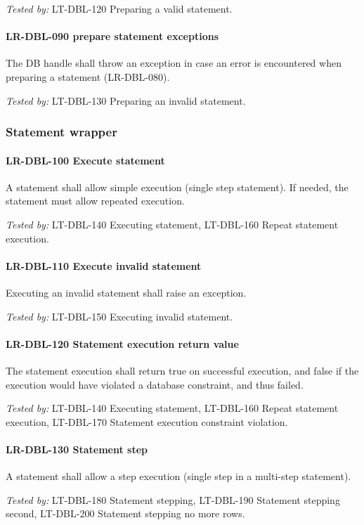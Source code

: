 \textit{Tested by: } LT-DBL-120 Preparing a valid statement.

\paragraph{LR-DBL-090 prepare statement exceptions}
The DB handle shall throw an exception in case an error is encountered when
preparing a statement (LR-DBL-080).

\textit{Tested by: } LT-DBL-130 Preparing an invalid statement.

\subsubsection{Statement wrapper}
\paragraph{LR-DBL-100 Execute statement}
A statement shall allow simple execution (single step statement). If needed, the
statement must allow repeated execution.

\textit{Tested by: } LT-DBL-140 Executing statement,
LT-DBL-160 Repeat statement execution.

\paragraph{LR-DBL-110 Execute invalid statement}
Executing an invalid statement shall raise an exception.

\textit{Tested by: } LT-DBL-150 Executing invalid statement.

\paragraph{LR-DBL-120 Statement execution return value}
The statement execution shall return true on successful execution, and
false if the execution would have violated a database constraint, and thus
failed.

\textit{Tested by: } LT-DBL-140 Executing statement,
LT-DBL-160 Repeat statement execution,
LT-DBL-170 Statement execution constraint violation.

\paragraph{LR-DBL-130 Statement step}
A statement shall allow a step execution (single step in a multi-step
statement).

\textit{Tested by: } LT-DBL-180 Statement stepping,
LT-DBL-190 Statement stepping second,
LT-DBL-200 Statement stepping no more rows.

